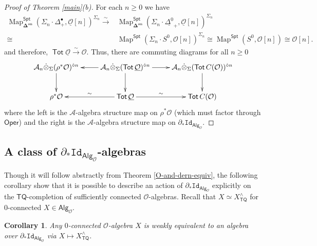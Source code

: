\documentclass[11pt]{amsart}
\newtheorem{corollary}[subsection]{Corollary}
\theoremstyle{definition}
\theoremstyle{remark}
\newcommand{\Spt}{\mathsf{Spt}}
\newcommand{\TQ}{\mathsf{TQ}}
\newcommand{\Tot}{\operatorname{\mathsf{Tot}}}
\newcommand{\Alg}[1]{ {\mathsf{Alg}_{\mathcal{#1}}} }
\newcommand{\Oper}{\mathsf{Oper}}
\newcommand{\Map}{\operatorname{Map}}
\newcommand{\Id}{\mathtt{Id}}
\newcommand{\Cal}[1]{\mathcal{#1}}
\newcommand{\circhat}{\hat{\circ}}
\newcommand{\tensordot}{\dot{\otimes}}
\newcommand{\bdel}{\mathbf{\Delta}}
\newcommand{\Dres}{\bdel^{\mathsf{res}}}
\begin{document}
\begin{proof}[Proof of Theorem \ref{main}(b)]
    For each $n\geq 0$ we have \begin{align*}
        \Map_{\Dres}^{\Spt} (\Sigma_n {\cdot} \Delta^{\bullet}_+, \underline{\Cal{O}}[n])^{\Sigma_n}\xrightarrow{\sim}& 
        \Map_{\Dres}^{\Spt} (\Sigma_n {\cdot} \underline{\Delta^0}_+, \underline{\Cal{O}}[n])^{\Sigma_n} \\
        \cong& \Map^{\Spt}( \Sigma_n {\cdot} S^0, \Cal{O}[n])^{\Sigma_n}\cong \Map^{\Spt}(S^0, \Cal{O}[n])\cong \Cal{O}[n].
    \end{align*} and therefore, $\Tot \underline{\Cal{O}}\xrightarrow{\sim} \Cal{O}$. Thus, there are commuting diagrams for all $n\geq 0$ \begin{equation} \xymatrix{
    \Cal{A}_n \tensordot_{\Sigma}  (\rho^*\Cal{O})^{\circhat n} \ar[d]
    & 
    \Cal{A}_n \tensordot_{\Sigma}  (\Tot \underline{\Cal{O}})^{\circhat n} \ar[d] \ar[r] \ar[l]
    &
    \Cal{A}_n \tensordot_{\Sigma}  (\Tot C(\Cal{O}))^{\circhat n} \ar[d]
    \\
    \rho^*\Cal{O}
    &
    \Tot \underline{\Cal{O}} \ar[r]^-{\sim} \ar[l]_-{\sim}
    &
    \Tot C(\Cal{O}) 
    }\end{equation}
    where the left is the $\Cal{A}$-algebra structure map on $\rho^* \Cal{O}$ (which must factor through $\Oper$) and the right is the $\Cal{A}$-algebra structure map on $\partial_* \Id_{\Alg{O}}$.\end{proof}

\subsection{A class of $\partial_* \Id_{\Alg{O}}$-algebras} 
Though it will follow abstractly from Theorem \ref{O-and-dern-equiv}, the following corollary show that it is possible to describe an action of $\partial_* \Id_{\Alg{O}}$ explicitly on the $\TQ$-completion of sufficiently connected $\Cal{O}$-algebras. Recall that $X\simeq X_{\TQ}^{\wedge}$ for $0$-connected $X \in \Alg{O}$.

\begin{corollary} \label{TQ-completion-is-der-alg}
    Any $0$-connected $\Cal{O}$-algebra $X$ is weakly equivalent to an algebra over $\partial_* \Id_{\Alg{O}}$ via $X\mapsto X_{\TQ}^{\wedge}$. 
\end{corollary}    
    
\end{document}
